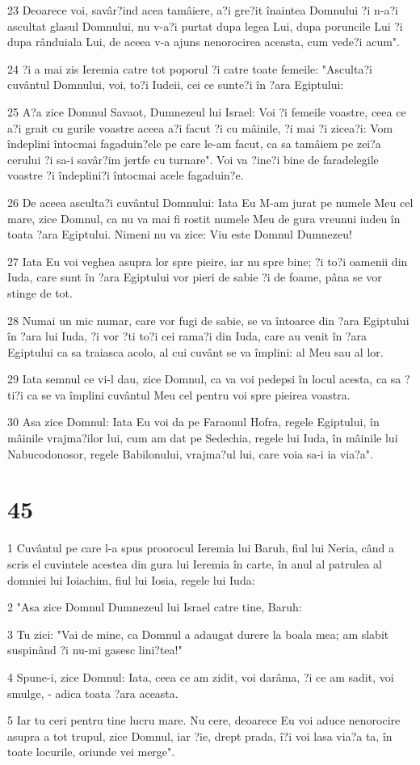 \par 23 Deoarece voi, savâr?ind acea tamâiere, a?i gre?it înaintea Domnului ?i n-a?i ascultat glasul Domnului, nu v-a?i purtat dupa legea Lui, dupa poruncile Lui ?i dupa rânduiala Lui, de aceea v-a ajuns nenorocirea aceasta, cum vede?i acum".
\par 24 ?i a mai zis Ieremia catre tot poporul ?i catre toate femeile: "Asculta?i cuvântul Domnului, voi, to?i Iudeii, cei ce sunte?i în ?ara Egiptului:
\par 25 A?a zice Domnul Savaot, Dumnezeul lui Israel: Voi ?i femeile voastre, ceea ce a?i grait cu gurile voastre aceea a?i facut ?i cu mâinile, ?i mai ?i zicea?i: Vom îndeplini întocmai fagaduin?ele pe care le-am facut, ca sa tamâiem pe zei?a cerului ?i sa-i savâr?im jertfe cu turnare". Voi va ?ine?i bine de faradelegile voastre ?i îndeplini?i întocmai acele fagaduin?e.
\par 26 De aceea asculta?i cuvântul Domnului: Iata Eu M-am jurat pe numele Meu cel mare, zice Domnul, ca nu va mai fi rostit numele Meu de gura vreunui iudeu în toata ?ara Egiptului. Nimeni nu va zice: Viu este Domnul Dumnezeu!
\par 27 Iata Eu voi veghea asupra lor spre pieire, iar nu spre bine; ?i to?i oamenii din Iuda, care sunt în ?ara Egiptului vor pieri de sabie ?i de foame, pâna se vor stinge de tot.
\par 28 Numai un mic numar, care vor fugi de sabie, se va întoarce din ?ara Egiptului în ?ara lui Iuda, ?i vor ?ti to?i cei rama?i din Iuda, care au venit în ?ara Egiptului ca sa traiasca acolo, al cui cuvânt se va împlini: al Meu sau al lor.
\par 29 Iata semnul ce vi-l dau, zice Domnul, ca va voi pedepsi în locul acesta, ca sa ?ti?i ca se va împlini cuvântul Meu cel pentru voi spre pieirea voastra.
\par 30 Asa zice Domnul: Iata Eu voi da pe Faraonul Hofra, regele Egiptului, în mâinile vrajma?ilor lui, cum am dat pe Sedechia, regele lui Iuda, în mâinile lui Nabucodonosor, regele Babilonului, vrajma?ul lui, care voia sa-i ia via?a".

\chapter{45}

\par 1 Cuvântul pe care l-a spus proorocul Ieremia lui Baruh, fiul lui Neria, când a scris el cuvintele acestea din gura lui Ieremia în carte, în anul al patrulea al domniei lui Ioiachim, fiul lui Iosia, regele lui Iuda:
\par 2 "Asa zice Domnul Dumnezeul lui Israel catre tine, Baruh:
\par 3 Tu zici: "Vai de mine, ca Domnul a adaugat durere la boala mea; am slabit suspinând ?i nu-mi gasesc lini?tea!"
\par 4 Spune-i, zice Domnul: Iata, ceea ce am zidit, voi darâma, ?i ce am sadit, voi smulge, - adica toata ?ara aceasta.
\par 5 Iar tu ceri pentru tine lucru mare. Nu cere, deoarece Eu voi aduce nenorocire asupra a tot trupul, zice Domnul, iar ?ie, drept prada, î?i voi lasa via?a ta, în toate locurile, oriunde vei merge".

